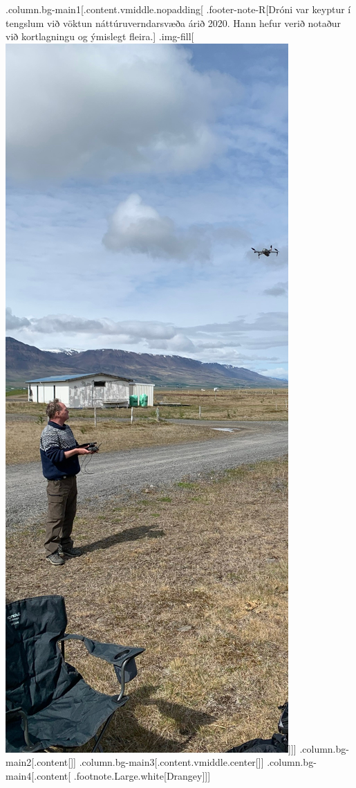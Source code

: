 \documentclass[
]{article}
\begin{document}
.column.bg-main1{[}.content.vmiddle.nopadding{[} .footer-note-R{[}Dróni
var keyptur í tengslum við vöktun náttúruverndarsvæða árið 2020. Hann
hefur verið notaður við kortlagningu og ýmislegt fleira.{]}
.img-fill{[}\includegraphics{myndir/droni.JPEG}{]}{]}{]}
.column.bg-main2{[}.content{[}{]}{]}
.column.bg-main3{[}.content.vmiddle.center{[}{]}{]}
.column.bg-main4{[}.content{[} .footnote.Large.white{[}Drangey{]}{]}{]}
\end{document}
